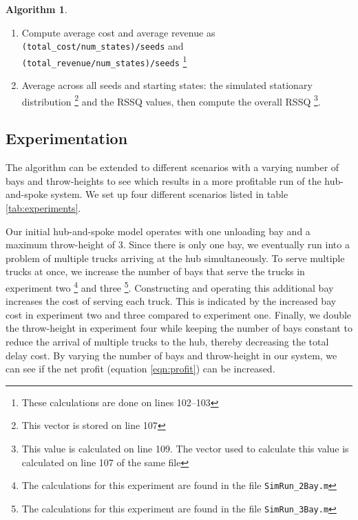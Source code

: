 \documentclass{article}
\theoremstyle{definition}
\newtheorem{algorithm}[theorem]{Algorithm}
\theoremstyle{remark}
\numberwithin{equation}{section}
\begin{document}
\begin{algorithm}
\begin{enumerate}
\begin{enumerate}
\begin{enumerate}
        \end{enumerate}
        \begin{align}
            \label{eqn:norm} \vec{\hat{\pi}} = \frac{\vec{s}}{\sum_i \vec{s_i}}
        \end{align}  
        where s is \lstinline|s_vec| and record RSSQ \footnote{This calculation is done on line 93 } (equation \ref{eqn:rssq})
        \item Store the final simulated stationary vector after $n$ iterations for the $k$th starting state \footnote{This result is stored on line 95 }.
    \end{enumerate}

    \item Compute average cost and average revenue as \lstinline|(total_cost/num_states)/seeds| and \\
    \lstinline|(total_revenue/num_states)/seeds| \footnote{These calculations are done on lines 102--103 }
    \item Average across all seeds and starting states: the simulated stationary distribution \footnote{This vector is stored on line 107 } and the RSSQ values, then compute the overall RSSQ \footnote{This value is calculated on line 109. The vector used to calculate this value is calculated on line 107 of the same file}.
\end{enumerate}
\end{algorithm}

\subsection{Experimentation} \label{sec:exp}
The algorithm can be extended to different scenarios with a varying number of bays and throw-heights to see which results in a more profitable run of the hub-and-spoke system. We set up four different scenarios listed in table \ref{tab:experiments}.

Our initial hub-and-spoke model operates with one unloading bay and a maximum throw-height of 3. Since there is only one bay, we eventually run into a problem of multiple trucks arriving at the hub simultaneously. To serve multiple trucks at once, we increase the number of bays that serve the trucks in experiment two \footnote{The calculations for this experiment are found in the file \lstinline|SimRun_2Bay.m|} and three \footnote{The calculations for this experiment are found in the file \lstinline|SimRun_3Bay.m|}. Constructing and operating this additional bay increases the cost of serving each truck. This is indicated by the increased bay cost in experiment two and three compared to experiment one. Finally, we double the throw-height in experiment four while keeping the number of bays constant to reduce the arrival of multiple trucks to the hub, thereby decreasing the total delay cost. By varying the number of bays and throw-height in our system, we can see if the net profit (equation \ref{eqn:profit}) can be increased.
\end{document}
